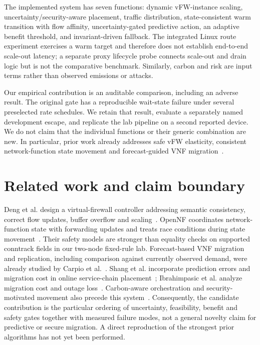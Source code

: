 \documentclass[11pt]{article}
\begin{document}
The implemented system has seven functions: dynamic vFW-instance scaling, uncertainty/security-aware placement, traffic distribution, state-consistent warm transition with flow affinity, uncertainty-gated predictive action, an adaptive benefit threshold, and invariant-driven fallback. The integrated Linux route experiment exercises a warm target and therefore does not establish end-to-end scale-out latency; a separate proxy lifecycle probe connects scale-out and drain logic but is not the comparative benchmark. Similarly, carbon and risk are input terms rather than observed emissions or attacks.

Our empirical contribution is an auditable comparison, including an adverse result. The original gate has a reproducible wait-state failure under several preselected rate schedules. We retain that result, evaluate a separately named development escape, and replicate the lab pipeline on a second reported device. We do not claim that the individual functions or their generic combination are new. In particular, prior work already addresses safe vFW elasticity, consistent network-function state movement and forecast-guided VNF migration~\cite{deng2017vfw,gemberjacobson2014opennf,carpio2021forecasting}.

\section{Related work and claim boundary}
Deng et al. design a virtual-firewall controller addressing semantic consistency, correct flow updates, buffer overflow and scaling~\cite{deng2017vfw}. OpenNF coordinates network-function state with forwarding updates and treats race conditions during state movement~\cite{gemberjacobson2014opennf}. Their safety models are stronger than equality checks on supported conntrack fields in our two-node fixed-rule lab. Forecast-based VNF migration and replication, including comparison against currently observed demand, were already studied by Carpio et al.~\cite{carpio2021forecasting}. Shang et al. incorporate prediction errors and migration cost in online service-chain placement~\cite{shang2020online}; Ibrahimpasic et al. analyze migration cost and outage loss~\cite{ibrahimpasic2021migration}. Carbon-aware orchestration and security-motivated movement also precede this system~\cite{bariesso,peretz2020mtd}. Consequently, the candidate contribution is the particular ordering of uncertainty, feasibility, benefit and safety gates together with measured failure modes, not a general novelty claim for predictive or secure migration. A direct reproduction of the strongest prior algorithms has not yet been performed.
\end{document}
